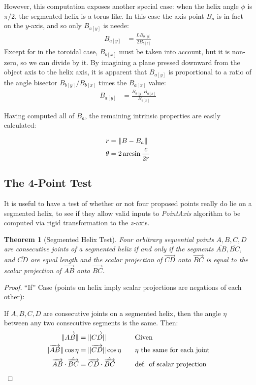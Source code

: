 \documentclass[11pt]{article}
\DeclarePairedDelimiter{\norm}{\lVert}{\rVert}
\newtheorem{theorem}{Theorem}
\begin{document}
{However, this computation exposes another special case: when the
helix angle $\phi$ is $\pi /2$, the segmented helix is
a torus-like. In this case the axis point $B_a$ is in fact
on the $y$-axis, and so only $B_{a[y]}$ is neede:
\begin{align}
  B_{a[y]} &=  \frac{L B_{b[y]}}{2 B_{b[z]}}
\end{align}
Except for in the toroidal case,  $B_{b[x]}$ must be taken into
account, but it is non-zero, so we can divide by it.
By imagining a plane pressed downward from the
object axis to the helix axis, it is apparent that $B_{a[y]}$
is proportional to a ratio of the angle bisector
$B_{b[y]}/B_{b[x]}$ times the $B_{a[x]}$ value:
\begin{align}
  B_{a[y]} &=  \frac{ B_{b[y]} B_{a[x]}}{ B_{b[x]}}
\end{align}

Having computed all of $B_a$, the remaining intrinsic properties are easily
calculated:

\begin{align}
  r &= \norm{B - B_a}  \\
  \theta &= 2 \arcsin{\frac{c}{2r}}
\end{align}


\subsection{The 4-Point Test}

It is useful to have a test of whether or not four proposed points really do lie on a segmented helix, to see
if they allow valid inputs to {\em PointAxis} algorithm to be computed via rigid
transformation to the $z$-axis.

\begin{theorem}[Segmented Helix Test]
  Four arbitrary sequential points $A,B,C,D$ are consecutive joints of a segmented helix if and only if
  the segments $\overline{AB},\overline{BC}$, and $\overline{CD}$ are equal length and the scalar projection
  of $\overrightarrow{CD}$ onto $\overrightarrow{BC}$ is equal to the scalar projection of $\overrightarrow{AB}$
  onto $\overrightarrow{BC}$.
\end{theorem}

\begin{proof}
  ``If'' Case (points on helix imply scalar projections are negations of each other):

  If $A,B,C,D$ are consecutive joints on a segmented helix, then the angle $\eta$ between any two consecutive segments is the
  same. Then:
  \begin{alignat*}{2}
    \norm{\overrightarrow{AB}} &= \norm{\overrightarrow{CD}} &\quad &\text{Given}\\
    \norm{\overrightarrow{AB}}\cos{\eta} &= \norm{\overrightarrow{CD}}\cos{\eta} &\quad &\text{$\eta$ the same for each joint} \\
    \overrightarrow{AB} \cdot \hat{\overrightarrow{BC}} &= \overrightarrow{CD} \cdot \hat{\overrightarrow{BC}} &\quad &\text{def. of scalar projection} \\
  \end{alignat*}


\end{proof}}
\end{document}

